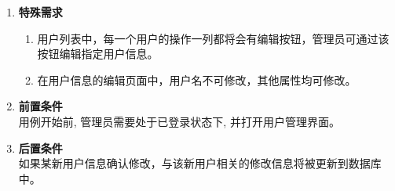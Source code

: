 \begin{enumerate}
\begin{enumerate}
\begin{enumerate}
\begin{enumerate}
            \end{enumerate}
        \end{enumerate}
    \end{enumerate}
    \item \textbf{特殊需求}
    \begin{enumerate}
        \item 用户列表中，每一个用户的操作一列都将会有编辑按钮，管理员可通过该按钮编辑指定用户信息。
        \item 在用户信息的编辑页面中，用户名不可修改，其他属性均可修改。
    \end{enumerate}
    \item \textbf{前置条件} \\ 用例开始前, 管理员需要处于已登录状态下, 并打开用户管理界面。
    \item \textbf{后置条件} \\ 如果某新用户信息确认修改，与该新用户相关的修改信息将被更新到数据库中。
\end{enumerate}






